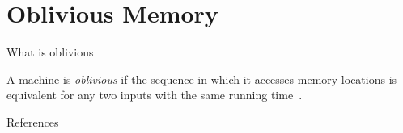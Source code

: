 
\section{Oblivious Memory}

	\begin{frame}{What is oblivious}

		\begin{definition}
			A machine is \textit{oblivious} if the sequence in which it accesses memory locations is equivalent for any two inputs with the same running time~\cite{Goldreich:1996:SPS:233551.233553}.
		\end{definition}

	\end{frame}

	\begin{frame}{References}
		
		
	\end{frame}
